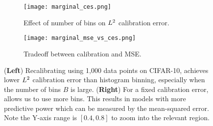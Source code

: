 \begin{figure}
  \centering
  \centering
     \begin{subfigure}[b]{0.54\textwidth}
         \centering
         \texttt{[image: marginal\_ces.png]}
         \caption{Effect of number of bins on $L^2{}$ calibration error.}
         \label{fig:marginal_calibrator_comparison_cifar}
     \end{subfigure}
     \hfill
     \begin{subfigure}[b]{0.44\textwidth}
         \centering
         \texttt{[image: marginal\_mse\_vs\_ces.png]}
         \caption{Tradeoff between calibration and MSE.}
         \label{fig:cifar_calibrator_cmp_mse_ce}
     \end{subfigure}
  \caption{
  (\textbf{Left}) Recalibrating using 1,000 data points on CIFAR-10, \ourcal{} achieves lower $L^2{}$ calibration error than histogram binning, especially when the number of bins $B$ is large.
  (\textbf{Right}) For a fixed calibration error, \ourcal{} allows us to use more bins. This results in models with more predictive power which can be measured by the mean-squared error. Note the Y-axis range is $[0.4, 0.8]$ to zoom into the relevant region.
  }
  \label{fig:nan2}
\end{figure}
